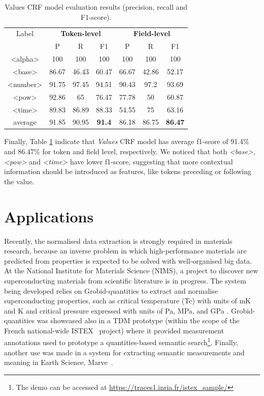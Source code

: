 \documentclass[sigconf]{acmart}
\begin{document}
\begin{table}[ht]
  \caption{Values CRF model evaluation results (precision, recall and F1-score).}
  \label{tab:values-evaluation}
  \begin{tabular}{c|ccc|ccc}
    \toprule
    Label & \multicolumn{3}{c}{\textbf{Token-level}} & \multicolumn{3}{c}{\textbf{Field-level}}\\
    & P & R & F1 & P & R & F1 \\
    \midrule
    <alpha>       & 100   & 100   & 100   & 100   & 100   & 100     \\
    <base>        & 86.67 & 46.43 & 60.47 & 66.67 & 42.86 & 52.17   \\
    <number>      & 91.75 & 97.45 & 94.51 & 90.43 & 97.2  & 93.69   \\
    <pow>         & 92.86 & 65    & 76.47 & 77.78 & 50    & 60.87   \\
    <time>        & 89.83 & 86.89 & 88.33 & 54.55 & 75    & 63.16   \\
    \midrule
    average       & 91.85 & 90.95 & \textbf{91.4} & 86.18 & 86.75 & \textbf{86.47}   \\
    \bottomrule
     \end{tabular}
\end{table}

Finally, Table \ref{tab:values-evaluation} indicate that \textit{Values} CRF model has average f1-score of 91.4\% and 86.47\% for token and field level, respectively. We noticed that both \textit{<base>}, \textit{<pow>} and \textit{<time>} have lower f1-score, suggesting that more contextual information should be introduced as features, like tokens preceding or following the value. 

\section{Applications}
\label{sec:use_cases}
Recently, the normalised data extraction is strongly required in materials research, because an inverse problem in which high-performance materials are predicted from properties is expected to be solved with well-organised big data. At the National Institute for Materials Science (NIMS), a project to discover new superconducting materials from scientific literature is in progress. The system being developed relies on Grobid-quantities to extract and normalise superconducting properties, such as critical temperature (Tc) with units of mK and K and critical pressure expressed with units of Pa, MPa, and GPa \cite{foppiano2019proposal}. Grobid-quantities was showcased also in a TDM prototype (within the scope of the French national-wide ISTEX~\cite{dazy2014istex} project) where it provided measurement annotations used to prototype a quantities-based semantic search\footnote{The demo can be accessed at \url{https://traces1.inria.fr/istex_sample/}}. Finally, another use was made in a system for extracting semantic measurements and meaning in Earth Science, Marve~\cite{hundman2017measurement}.  
\end{document}
